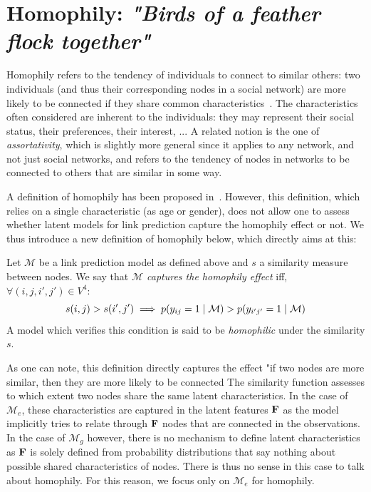 \section{Homophily: \emph{"Birds of a feather flock together"}}
\label{sec:homophily}

Homophily refers to the tendency of individuals to connect to similar others: two individuals (and thus their corresponding nodes in a social network) are more likely to be connected if they share common characteristics~\cite{mcpherson2001birds,lazarsfeld1954friendship}. The characteristics often considered are inherent to the individuals: they may represent their social status, their preferences, their interest, ... A related notion is the one of {\it assortativity}, which is slightly more general since it applies to any network, and not just social networks, and refers to the tendency of nodes in networks to be connected to others that are similar in some way.

A definition of homophily has been proposed in~\cite{la2010randomization}. However, this definition, which relies on a single characteristic (as age or gender), does not allow one to assess whether latent models for link prediction capture the homophily effect or not. We thus introduce a new definition of homophily below, which directly aims at this:
%
\begin{definition}[Homophily]
	Let $\mathcal{M}$ be a link prediction model as defined above and $s$ a similarity measure between nodes. We say that \emph{$\mathcal{M}$ captures the homophily effect} iff, $\forall (i,j,i',j') \in V^4$:
%
\begin{equation}
s(i,j) > s(i',j')  \implies p(y_{ij}=1 \mid \mathcal{M}) > p(y_{i'j'}=1  \mid \mathcal{M}) \nonumber
\end{equation}
%
A model which verifies this condition is said to be \emph{homophilic} under the similarity $s$.
\end{definition}
%
As one can note, this definition directly captures the effect "if two nodes are more similar, then they are more likely to be connected The similarity function assesses to which extent two nodes share the same latent characteristics. In the case of $\mathcal{M}_e$, these characteristics are captured in the latent features $\mathbf{F}$ as the model implicitly tries to relate through $\mathbf{F}$ nodes that are connected in the observations. In the case of $\mathcal{M}_g$ however, there is no mechanism to define latent characteristics as $\mathbf{F}$ is solely defined from probability distributions that say nothing about possible shared characteristics of nodes. There is thus no sense in this case to talk about homophily. For this reason, we focus only on $\mathcal{M}_e$ for homophily. 

